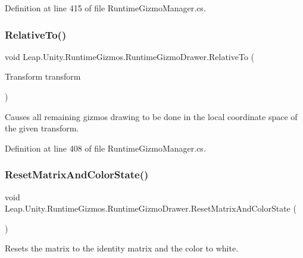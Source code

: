 Definition at line 415 of file Runtime\+Gizmo\+Manager.\+cs.

\mbox{\label{class_leap_1_1_unity_1_1_runtime_gizmos_1_1_runtime_gizmo_drawer_a4b64f55ea3bb3996b33e12cfaa8e04bd}} 
\subsubsection{\texorpdfstring{RelativeTo()}{RelativeTo()}}
{\footnotesize\ttfamily void Leap.\+Unity.\+Runtime\+Gizmos.\+Runtime\+Gizmo\+Drawer.\+Relative\+To (\begin{DoxyParamCaption}\item[{Transform}]{transform }\end{DoxyParamCaption})}



Causes all remaining gizmos drawing to be done in the local coordinate space of the given transform. 



Definition at line 408 of file Runtime\+Gizmo\+Manager.\+cs.

\mbox{\label{class_leap_1_1_unity_1_1_runtime_gizmos_1_1_runtime_gizmo_drawer_a92de6abecce2909ecf3acdc5e4e93e37}} 
\subsubsection{\texorpdfstring{ResetMatrixAndColorState()}{ResetMatrixAndColorState()}}
{\footnotesize\ttfamily void Leap.\+Unity.\+Runtime\+Gizmos.\+Runtime\+Gizmo\+Drawer.\+Reset\+Matrix\+And\+Color\+State (\begin{DoxyParamCaption}{ }\end{DoxyParamCaption})}



Resets the matrix to the identity matrix and the color to white. 



